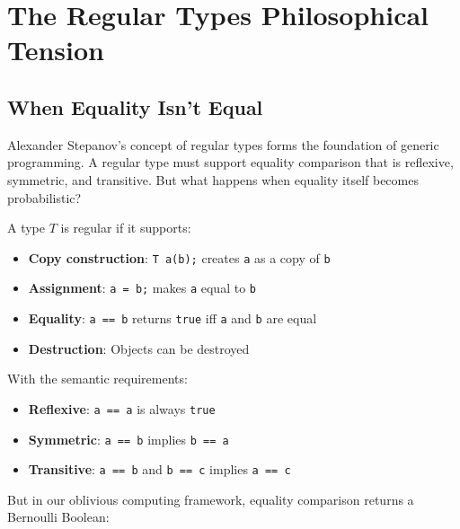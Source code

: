 \section{The Regular Types Philosophical Tension}
\label{sec:regular-types-tension}

\subsection{When Equality Isn't Equal}

Alexander Stepanov's concept of regular types forms the foundation of generic programming. A regular type must support equality comparison that is reflexive, symmetric, and transitive. But what happens when equality itself becomes probabilistic?

\begin{definition}
A type $T$ is regular if it supports:
\begin{itemize}
\item \textbf{Copy construction}: \texttt{T a(b);} creates \texttt{a} as a copy of \texttt{b}
\item \textbf{Assignment}: \texttt{a = b;} makes \texttt{a} equal to \texttt{b}
\item \textbf{Equality}: \texttt{a == b} returns \texttt{true} iff \texttt{a} and \texttt{b} are equal
\item \textbf{Destruction}: Objects can be destroyed
\end{itemize}
With the semantic requirements:
\begin{itemize}
\item \textbf{Reflexive}: \texttt{a == a} is always \texttt{true}
\item \textbf{Symmetric}: \texttt{a == b} implies \texttt{b == a}
\item \textbf{Transitive}: \texttt{a == b} and \texttt{b == c} implies \texttt{a == c}
\end{itemize}
\end{definition}

But in our oblivious computing framework, equality comparison returns a Bernoulli Boolean:

